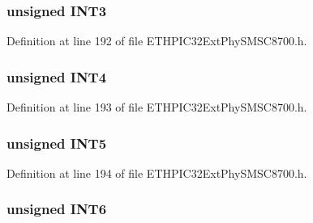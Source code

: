 \subsubsection[{I\+N\+T3}]{\setlength{\rightskip}{0pt plus 5cm}unsigned I\+N\+T3}\label{union_____i_n_t_m_a_s_kbits__t_a6c886eb45c0096c0d3bc37b05416b171}


Definition at line 192 of file E\+T\+H\+P\+I\+C32\+Ext\+Phy\+S\+M\+S\+C8700.\+h.

\hypertarget{union_____i_n_t_m_a_s_kbits__t_af8c7aac64c1dded6d4bab1e8d958bc19}{}
\subsubsection[{I\+N\+T4}]{\setlength{\rightskip}{0pt plus 5cm}unsigned I\+N\+T4}\label{union_____i_n_t_m_a_s_kbits__t_af8c7aac64c1dded6d4bab1e8d958bc19}


Definition at line 193 of file E\+T\+H\+P\+I\+C32\+Ext\+Phy\+S\+M\+S\+C8700.\+h.

\hypertarget{union_____i_n_t_m_a_s_kbits__t_a832ae44f354c9afd727f5ace181e439f}{}
\subsubsection[{I\+N\+T5}]{\setlength{\rightskip}{0pt plus 5cm}unsigned I\+N\+T5}\label{union_____i_n_t_m_a_s_kbits__t_a832ae44f354c9afd727f5ace181e439f}


Definition at line 194 of file E\+T\+H\+P\+I\+C32\+Ext\+Phy\+S\+M\+S\+C8700.\+h.

\hypertarget{union_____i_n_t_m_a_s_kbits__t_a32ed04340c8ad7c9e9615760fe9c56e9}{}
\subsubsection[{I\+N\+T6}]{\setlength{\rightskip}{0pt plus 5cm}unsigned I\+N\+T6}\label{union_____i_n_t_m_a_s_kbits__t_a32ed04340c8ad7c9e9615760fe9c56e9}


